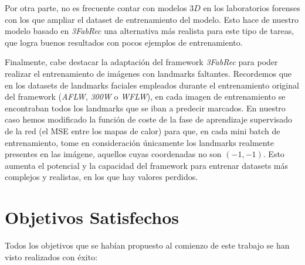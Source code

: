 \medskip

\noindent Por otra parte, no es frecuente contar con modelos $3D$ en los laboratorios forenses con los que ampliar el dataset de entrenamiento del modelo. Esto hace de nuestro modelo basado en \textit{3FabRec} una alternativa más realista para este tipo de tareas, que logra buenos resultados con pocos ejemplos de entrenamiento.

\medskip

\noindent Finalmente, cabe destacar la adaptación del framework \textit{3FabRec} para poder realizar el entrenamiento de imágenes con landmarks faltantes. Recordemos que en los datasets de landmarks faciales empleados durante el entrenamiento original del framework (\textit{AFLW}, \textit{300W} o \textit{WFLW}), en cada imagen de entrenamiento se encontraban todos los landmarks que se iban a predecir marcados. En nuestro caso hemos modificado la función de coste de la fase de aprendizaje supervisado de la red (el MSE entre los mapas de calor) para que, en cada mini batch de entrenamiento, tome en consideración únicamente los landmarks realmente presentes en las imágene, aquellos cuyas coordenadas no son $(-1,-1)$. Esto aumenta el potencial y la capacidad del framework para entrenar datasets más complejos y realistas, en los que hay valores perdidos.

\section{Objetivos Satisfechos}

Todos los objetivos que se habían propuesto al comienzo de este trabajo se han visto realizados con éxito:

